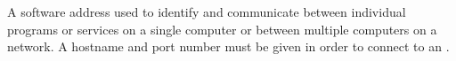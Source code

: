 \item[Port Number] {
A software address used to identify and communicate between individual programs or services on a single computer or between multiple computers on a network. A hostname and port number must be given in order to connect to an \gdagent{}.
}
